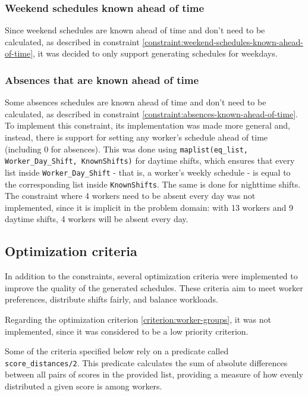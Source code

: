 \documentclass[conference]{IEEEtran}
\def\constraint#1{\vspace{4pt} {#1}}
\begin{document}
\constraint {
    \subsubsection*{Weekend schedules known ahead of time}   
    Since weekend schedules are known ahead of time and don't need to be calculated, as described in constraint \ref{constraint:weekend-schedules-known-ahead-of-time}, it was decided to only support generating schedules for weekdays.
}
    
\constraint {
    \subsubsection*{Absences that are known ahead of time}
    Some absences schedules are known ahead of time and don't need to be calculated, as described in constraint \ref{constraint:absences-known-ahead-of-time}. To implement this constraint, its implementation was made more general and, instead, there is support for setting any worker's schedule ahead of time (including 0 for absences).
    This was done using \texttt{maplist(eq\_list, Worker\_Day\_Shift, KnownShifts)} for daytime shifts, which ensures that every list inside \texttt{Worker\_Day\_Shift} - that is, a worker's weekly schedule - is equal to the corresponding list inside \texttt{KnownShifts}. The same is done for nighttime shifts.
    The constraint where 4 workers need to be absent every day was not implemented, since it is implicit in the problem domain: with 13 workers and 9 daytime shifts, 4 workers will be absent every day.
}

\subsection{Optimization criteria}
\label{section:optimization-criteria}

In addition to the constraints, several optimization criteria were implemented to improve the quality of the generated schedules. These criteria aim to meet worker preferences, distribute shifts fairly, and balance workloads.

Regarding the optimization criterion \ref{criterion:worker-groups}, it was not implemented, since it was considered to be a low priority criterion.

Some of the criteria specified below rely on a predicate called \texttt{score\_distances/2}. This predicate calculates the sum of absolute differences between all pairs of scores in the provided list, providing a measure of how evenly distributed a given score is among workers.
\end{document}

